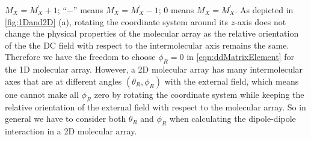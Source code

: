 $M_X = M_X^{'} + 1$;  ``$-$'' means
 $M_X = M_X^{'} - 1$; $0$ means $M_X = M_X^{'}$. 
As depicted in \autoref{fig:1Dand2D} (a), rotating the coordinate system around its $z$-axis does not change the 
physical properties of the molecular array as the relative orientation of the the DC field with respect to the
 intermolecular axis remains the same. Therefore we have the freedom to choose
 $\phi_{R} = 0$ in \autoref{eqn:ddMatrixElement} for the 1D molecular array. However, a 2D molecular array has
 many intermolecular axes that are at different angles $(\theta_{R}, \phi_{R})$ with the external field, which means 
one cannot make all $\phi_{R}$ zero by rotating the coordinate system while keeping the relative orientation of 
the external field with respect to the molecular array. So in general we have to consider both $\theta_{R}$ and 
$\phi_{R}$ when calculating the dipole-dipole interaction in a 2D molecular array.


